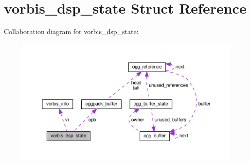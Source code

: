 \hypertarget{structvorbis__dsp__state}{}\section{vorbis\+\_\+dsp\+\_\+state Struct Reference}
\label{structvorbis__dsp__state}


Collaboration diagram for vorbis\+\_\+dsp\+\_\+state\+:
\nopagebreak
\begin{figure}[H]
\begin{center}
\leavevmode
\includegraphics[width=350pt]{structvorbis__dsp__state__coll__graph}
\end{center}
\end{figure}
